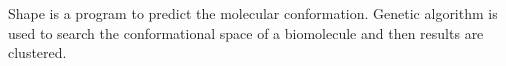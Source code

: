 Shape is a program to predict the molecular conformation. Genetic algorithm is used to search the conformational space of a biomolecule and then results are clustered. 